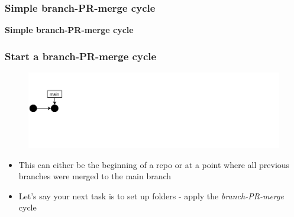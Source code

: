 \documentclass[aspectratio=169]{beamer} %
\begin{document}
\begin{frame}
	\frametitle{Simple branch-PR-merge cycle}

	\huge\centering \textbf{Simple branch-PR-merge cycle}

\end{frame}


\begin{frame}
	\frametitle{Start a branch-PR-merge cycle}

	\vspace{-.5cm}
	\begin{minipage}[t][5cm][t]{\textwidth}
		\begin{figure}
			\centering
			\includegraphics[width=\textwidth]{./img/dime-gitflow-network-0.png}
		\end{figure}
	\end{minipage}

	\vspace{-.5cm}
	\begin{minipage}[t][5cm][t]{\textwidth}
		\begin{itemize}
			\setlength\itemsep{.5em}
			\item This can either be the beginning of a repo
			or at a point where all previous branches were merged
			to the main branch
			\item Let's say your next task is to set up folders
			- apply the \textit{branch-PR-merge} cycle
		\end{itemize}
	\end{minipage}

\end{frame}
\end{document}
